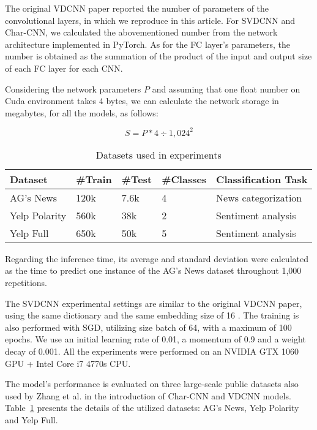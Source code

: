 \documentclass[conference]{IEEEtran}
\newcommand{\ra}[1]{\renewcommand{\arraystretch}{#1}}
\begin{document}
The original VDCNN paper reported the number of parameters of the convolutional layers, in which we reproduce in this article. For SVDCNN and Char-CNN, we calculated the abovementioned number from the network architecture implemented in PyTorch. As for the FC layer's parameters, the number is obtained as the summation of the product of the input and output size of each FC layer for each CNN.







Considering the network parameters $P$ and assuming that one float number on Cuda environment takes 4 bytes, we can calculate the network storage in megabytes, for all the models, as follows:

\begin{equation}
     S = P \ast 4 \div 1,024^{2}
\end{equation}

\begin{table}[htpb]
\caption{Datasets used in experiments}
\ra{1.3}
\begin{center}
\begin{tabular}{@{}lllll@{}}\toprule
Dataset          & \#Train & \#Test & \#Classes & Classification Task  \\  \midrule
AG's News        & 120k  & 7.6k   & 4   & News categorization \\
Yelp Polarity & 560k & 38k  & 2  & Sentiment analysis  \\
Yelp Full & 650k & 50k  & 5  & Sentiment analysis  \\
\bottomrule
\end{tabular}
\end{center}
\label{datasets}
\end{table}

Regarding the inference time, its average and standard deviation were calculated as the time to predict one instance of the AG's News dataset throughout 1,000 repetitions. 

The SVDCNN experimental settings are similar to the original VDCNN paper, using the same dictionary and the same embedding size of 16 \cite{conneau2016very}.  The training is also performed with SGD, utilizing size batch of 64, with a maximum of 100 epochs. We use an initial learning rate of 0.01, a momentum of 0.9 and a weight decay of 0.001.  All the experiments were performed on an NVIDIA GTX 1060 GPU + Intel Core i7 4770s CPU.

The model's performance is evaluated on three large-scale public datasets also used by Zhang et al. \cite{zhang2015character} in the introduction of Char-CNN and VDCNN models. Table~\ref{datasets} presents the details of the utilized datasets: AG's News, Yelp Polarity and Yelp Full.
\end{document}
